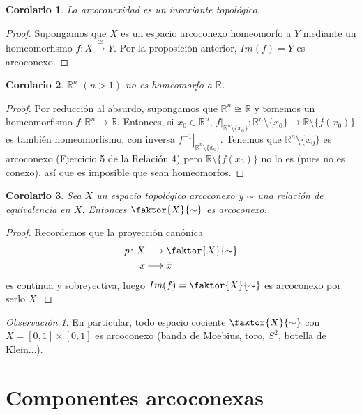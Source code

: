 \documentclass[12pt]{report}
\newtheorem{corollary}{Corolario}[chapter]
\theoremstyle{definition}
\theoremstyle{definition}
\theoremstyle{remark}
\newtheorem*{obs}{Observación} %
\newcommand{\R}{\mathbb R}
\begin{document}
\begin{corollary}
La arcoconexidad es un invariante topológico.
\end{corollary}

\begin{proof}
Supongamos que $X$ es un espacio arcoconexo homeomorfo a $Y$ mediante un homeomorfismo $f \colon X \xrightarrow{\cong} Y$. Por la proposición anterior, $Im(f) = Y$ es arcoconexo.
\end{proof}

\begin{corollary}
$\R^n$ $(n>1)$ no es homeomorfo a $\R$.
\end{corollary}

\begin{proof}
Por reducción al absurdo, supongamos que $\R^n \cong \R$ y tomemos un homeomorfismo $f \colon \R^n \to \R$. Entonces, si $x_0 \in \R^n$, $\left.f\right|_{\R^n \setminus \{x_0\}} \colon \R^n \setminus \{x_0\} \to \R \setminus \{f(x_0)\}$ es también homeomorfismo, con inversa $\left.f^{-1}\right|_{\R^n \setminus \{x_0\}}$. Tenemos que $\R^n \setminus \{x_0\}$ es arcoconexo (Ejercicio 5 de la Relación 4) pero $\R \setminus \{f(x_0)\}$ no lo es (pues no es conexo), así que es imposible que sean homeomorfos.
\end{proof}

\begin{corollary}
\label{cor2.7.}
Sea $X$ un espacio topológico arcoconexo y $\sim$ una relación de equivalencia en $X$. Entonces $\faktor{X}{\sim}$ es arcoconexo.
\end{corollary}

\begin{proof}
Recordemos que la proyección canónica
\[
\begin{aligned}[t]
    p \colon X & \longrightarrow \faktor{X}{\sim} \\
    x & \longmapsto \overline{x}
\end{aligned}
\]
es continua y sobreyectiva, luego $Im(f) = \faktor{X}{\sim}$ es arcoconexo por serlo $X$.
\end{proof}

\begin{obs}
En particular, todo espacio cociente $\faktor{X}{\sim}$ con $X = [0,1] \times [0,1]$ es arcoconexo (banda de Moebius, toro, $S^2$, botella de Klein...).
\end{obs}

\section{Componentes arcoconexas}
\end{document}

